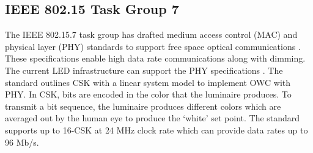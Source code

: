 \subsection{IEEE 802.15 Task Group 7}
\label{relatedStandard}
The IEEE 802.15.7 task group has drafted medium access control (MAC) and physical layer (PHY) standards to support free space optical communications \cite{IEEE802.15.7}. These specifications enable high data rate communications along with dimming. The current LED infrastructure can support the PHY specifications \cite{raj12a}. The standard outlines CSK with a linear system model to implement OWC with PHY. In CSK, bits are encoded in the color that the luminaire produces. To transmit a bit sequence, the luminaire produces different colors which are averaged out by the human eye to produce the `white' set point. The standard supports up to 16-CSK at 24 MHz clock rate which can provide data rates up to 96 Mb/s.

